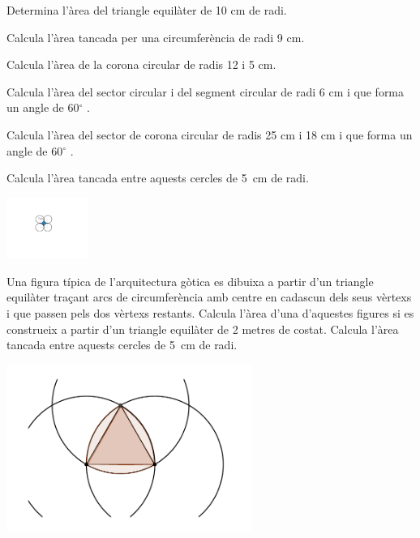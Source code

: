 \begin{mylist}
\exer  Determina l'àrea  del triangle equilàter de 10 cm de radi.

\exer  Calcula l'àrea tancada per una circumferència de radi 9 cm.

\exer  Calcula l'àrea de la corona circular de radis 12 i 5 cm.

\exer  Calcula l'àrea del sector circular i del segment circular de radi 6 cm i que forma un angle de 60${}^\circ$ . 

\exer  Calcula l'àrea del sector de corona circular de radis 25 cm i 18 cm i que forma un angle de 60${}^\circ$ . 

\exer[1]  Calcula l'àrea tancada entre aquests cercles de 5~cm de radi.
\begin{center}
	\includegraphics[width=0.2\textwidth]{img-09/fig9}
\end{center}

\vspace*{-1.5cm}
\exer \begin{minipage}[t]{0.7\textwidth}
	Una figura típica de l'arquitectura gòtica es dibuixa a partir d'un triangle equilàter traçant arcs de circumferència amb centre en cadascun dels seus vèrtexs i que passen pels dos vèrtexs restants. Calcula l'àrea d'una d'aquestes figures si es construeix a partir d'un triangle equilàter de 2 metres de costat. Calcula l'àrea tancada entre aquests cercles de 5~cm de radi.
\end{minipage}
\begin{minipage}{0.3\textwidth}
	\centering
	\vspace{2cm}
	\includegraphics[width=0.6\textwidth]{img-09/fig10}
\end{minipage}


\end{mylist}
